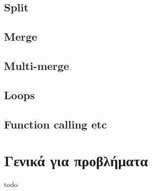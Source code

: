 \subsection{Split}
\subsection{Merge}
\subsection{Multi-merge}
\subsection{Loops}
\subsection{Function calling etc}


\section{Γενικά για προβλήματα}

todo

